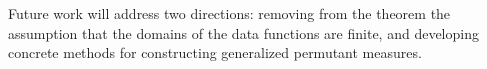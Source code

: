 \documentclass[11pt]{article}
\newcommand{\R}{\mathbb{R}}
\begin{document}
Future work will address two directions: removing from the theorem the assumption that the domains of the data functions are finite, and developing concrete methods for constructing generalized permutant measures.


\end{document}
